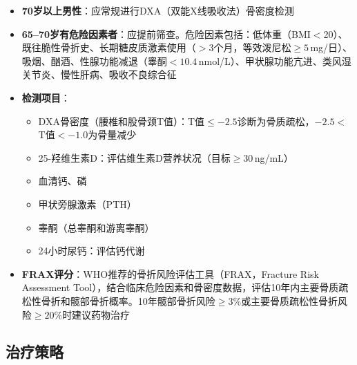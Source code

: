 \documentclass[12pt,a4paper,twoside]{ctexbook}
\begin{document}
\begin{itemize}[leftmargin=2cm]
	\item \textbf{70岁以上男性}：应常规进行DXA（双能X线吸收法）骨密度检测
	\item \textbf{65--70岁有危险因素者}：应提前筛查。危险因素包括：低体重（BMI$<$20）、既往脆性骨折史、长期糖皮质激素使用（$>3$个月，等效泼尼松$\geq 5\,$mg/日）、吸烟、酗酒、性腺功能减退（睾酮$<10.4\,$nmol/L）、甲状腺功能亢进、类风湿关节炎、慢性肝病、吸收不良综合征
	\item \textbf{检测项目}：
	\begin{itemize}
		\item DXA骨密度（腰椎和股骨颈T值）：T值$\leq -2.5$诊断为骨质疏松，$-2.5 < $T值$< -1.0$为骨量减少
		\item 25-羟维生素D：评估维生素D营养状况（目标$\geq 30\,$ng/mL）
		\item 血清钙、磷
		\item 甲状旁腺激素（PTH）
		\item 睾酮（总睾酮和游离睾酮）
		\item 24小时尿钙：评估钙代谢
	\end{itemize}
	\item \textbf{FRAX评分}：WHO推荐的骨折风险评估工具（FRAX，Fracture Risk Assessment Tool），结合临床危险因素和骨密度数据，评估10年内主要骨质疏松性骨折和髋部骨折概率。10年髋部骨折风险$\geq 3\%$或主要骨质疏松性骨折风险$\geq 20\%$时建议药物治疗
\end{itemize}

\subsection{治疗策略}
\end{document}
